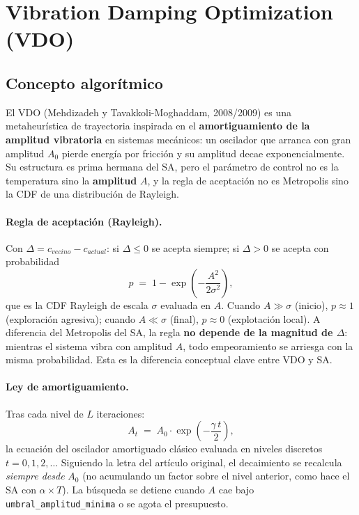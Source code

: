 \section{Vibration Damping Optimization (VDO)}
\label{sec:mh-vdo}

\subsection{Concepto algorítmico}
El VDO (Mehdizadeh y Tavakkoli-Moghaddam, 2008/2009) es una metaheurística de
trayectoria inspirada en el \textbf{amortiguamiento de la amplitud
vibratoria} en sistemas mecánicos: un oscilador que arranca con gran amplitud
$A_0$ pierde energía por fricción y su amplitud decae exponencialmente. Su
estructura es prima hermana del SA, pero el parámetro de control no es la
temperatura sino la \textbf{amplitud} $A$, y la regla de aceptación no es
Metropolis sino la CDF de una distribución de Rayleigh.

\paragraph{Regla de aceptación (Rayleigh).} Con $\Delta = c_{vecino} -
c_{actual}$: si $\Delta \le 0$ se acepta siempre; si $\Delta > 0$ se acepta
con probabilidad
\[
  p \;=\; 1 - \exp\!\left(-\frac{A^2}{2\sigma^2}\right),
\]
que es la CDF Rayleigh de escala $\sigma$ evaluada en $A$. Cuando $A \gg
\sigma$ (inicio), $p \approx 1$ (exploración agresiva); cuando $A \ll \sigma$
(final), $p \approx 0$ (explotación local). A diferencia del Metropolis del
SA, la regla \textbf{no depende de la magnitud de $\Delta$}: mientras el
sistema vibra con amplitud $A$, todo empeoramiento se arriesga con la misma
probabilidad. Esta es la diferencia conceptual clave entre VDO y SA.

\paragraph{Ley de amortiguamiento.} Tras cada nivel de $L$ iteraciones:
\[
  A_{t} \;=\; A_0 \cdot \exp\!\left(-\frac{\gamma\, t}{2}\right),
\]
la ecuación del oscilador amortiguado clásico evaluada en niveles discretos
$t = 0, 1, 2, \dots$ Siguiendo la letra del artículo original, el decaimiento
se recalcula \emph{siempre desde} $A_0$ (no acumulando un factor sobre el
nivel anterior, como hace el SA con $\alpha \times T$). La búsqueda se
detiene cuando $A$ cae bajo \texttt{umbral\_amplitud\_minima} o se agota el
presupuesto.

